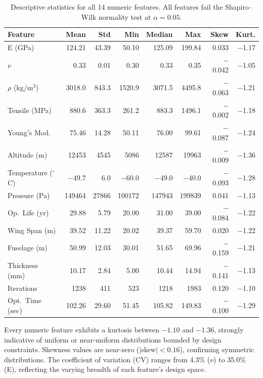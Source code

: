 \documentclass[11pt, a4paper]{report}
\begin{document}
\begin{table}[H]
\centering
\caption{Descriptive statistics for all 14 numeric features. All features fail the Shapiro--Wilk normality test at $\alpha = 0.05$.}
\label{tab:univariate}
\footnotesize
\begin{tabular}{lrrrrrrr}
\toprule
\textbf{Feature} & \textbf{Mean} & \textbf{Std} & \textbf{Min} & \textbf{Median} & \textbf{Max} & \textbf{Skew} & \textbf{Kurt.} \\
\midrule
E (GPa)               & 124.21 & 43.39 &  50.10 & 125.09 & 199.84 &  0.033 & $-$1.17 \\
$\nu$                  &   0.33 &  0.01 &   0.30 &   0.33 &   0.35 & $-$0.042 & $-$1.05 \\
$\rho$ (kg/m$^3$)     & 3018.0 & 843.3 & 1520.9 & 3071.5 & 4495.8 & $-$0.063 & $-$1.21 \\
Tensile (MPa)          & 880.6  & 363.3 &  261.2 &  883.3 & 1496.1 & $-$0.002 & $-$1.18 \\
Young's Mod.           &  75.46 & 14.28 &  50.11 &  76.00 &  99.61 & $-$0.087 & $-$1.24 \\
Altitude (m)           & 12453  &  4545 &   5086 &  12587 &  19963 & $-$0.009 & $-$1.36 \\
Temperature ($^\circ$C) & $-$49.7 &   6.0 & $-$60.0 & $-$49.0 & $-$40.0 & $-$0.093 & $-$1.28 \\
Pressure (Pa)          & 149464 & 27866 & 100172 & 147943 & 199839 &  0.041 & $-$1.13 \\
Op.\ Life (yr)         &  29.88 &  5.79 &  20.00 &  31.00 &  39.00 & $-$0.084 & $-$1.22 \\
Wing Span (m)          &  39.52 & 11.22 &  20.02 &  39.37 &  59.70 &  0.020 & $-$1.22 \\
Fuselage (m)           &  50.99 & 12.03 &  30.01 &  51.65 &  69.96 & $-$0.159 & $-$1.21 \\
Thickness (mm)         &  10.17 &  2.84 &   5.00 &  10.44 &  14.94 & $-$0.141 & $-$1.13 \\
Iterations             &  1238  &   411 &    523 &   1218 &   1983 &  0.120 & $-$1.10 \\
Opt.\ Time (sec)       & 102.26 & 29.60 &  51.45 & 105.82 & 149.83 & $-$0.100 & $-$1.29 \\
\bottomrule
\end{tabular}
\end{table}

\begin{findingbox}
Every numeric feature exhibits a kurtosis between $-1.10$ and $-1.36$, strongly indicative of uniform or near-uniform distributions bounded by design constraints. Skewness values are near-zero ($|$skew$| < 0.16$), confirming symmetric distributions. The coefficient of variation (CV) ranges from 4.3\% ($\nu$) to 35.0\% (E), reflecting the varying breadth of each feature's design space.
\end{findingbox}
\end{document}
